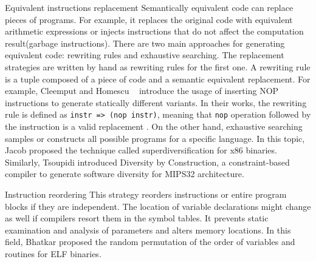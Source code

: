 \begin{strategy}{Equivalent instructions replacement}
    \label{strategy:S1}
    \normalfont 
    Semantically equivalent code can replace pieces of programs. For example, it replaces the original code with equivalent arithmetic expressions or injects instructions that do not affect the computation result(garbage instructions). There are two main approaches for generating equivalent code: rewriting rules and exhaustive searching. The replacement strategies are written by hand as rewriting rules for the first one. A rewriting rule is a tuple composed of a piece of code and a semantic equivalent replacement. For example, Cleemput \etal \cite{Cleemput2012} and Homescu \etal~\cite{homescu2013profile} introduce the usage of inserting NOP instructions to generate statically different variants. In their works, the rewriting rule is defined as \texttt{instr => (nop instr)}, meaning that \texttt{nop} operation followed by the instruction is a valid replacement .
    On the other hand, exhaustive searching samples or constructs all possible programs for a specific language. In this topic, Jacob \etal \cite{jacob2008superdiversifier} proposed the technique called superdiversification for x86 binaries. Similarly, Tsoupidi \etal \cite{Tsoupidi2020ConstraintBasedSD} introduced Diversity by Construction, a constraint-based compiler to generate software diversity for MIPS32 architecture.  
\end{strategy}


\begin{strategy}{Instruction reordering}
    \label{strategy:S2}
    \normalfont
    This strategy reorders instructions or entire program blocks if they are independent.
    The location of variable declarations might change as well if compilers resort them in the symbol tables. It prevents static examination and analysis of parameters and alters memory locations. In this field, Bhatkar \etal \cite{bhatkar03, bhatkar2005efficient} proposed the random permutation of the order of variables and routines for ELF binaries.
\end{strategy}

